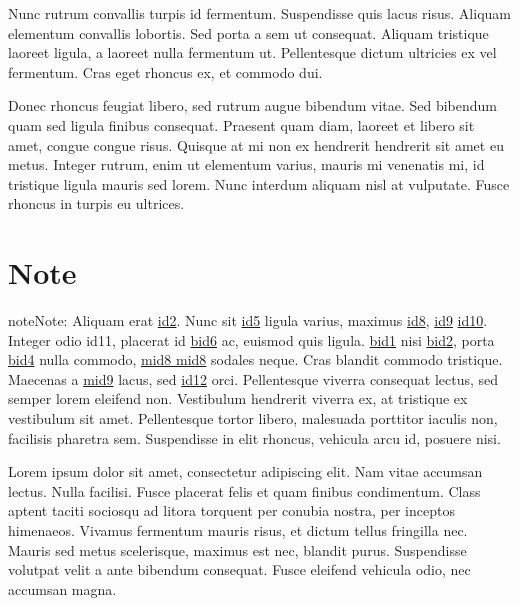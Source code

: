 \sphinxAtStartPar
Nunc rutrum convallis turpis id fermentum. Suspendisse quis lacus risus. Aliquam elementum convallis
lobortis. Sed porta a sem ut consequat. Aliquam tristique laoreet ligula, a laoreet nulla fermentum
ut. Pellentesque dictum ultricies ex vel fermentum. Cras eget rhoncus ex, et commodo dui.

\sphinxAtStartPar
Donec rhoncus feugiat libero, sed rutrum augue bibendum vitae. Sed bibendum quam sed ligula finibus
consequat. Praesent quam diam, laoreet et libero sit amet, congue congue risus. Quisque at mi non ex
hendrerit hendrerit sit amet eu metus. Integer rutrum, enim ut elementum varius, mauris mi venenatis
mi, id tristique ligula mauris sed lorem. Nunc interdum aliquam nisl at vulputate. Fusce rhoncus in
turpis eu ultrices.


\section{Note}
\label{\detokenize{test:note}}
\begin{sphinxadmonition}{note}{Note:}
\sphinxAtStartPar
Aliquam erat \hyperlink{\detokenize{id2}}{id2}. Nunc sit \hyperlink{\detokenize{id5}}{id5} ligula varius, maximus
\hyperlink{\detokenize{id8}}{id8}, \hyperlink{\detokenize{id9}}{id9} \hyperlink{\detokenize{id10}}{id10}. Integer odio
\hypertarget{\detokenize{id11}}{id11}, placerat id \hyperlink{\detokenize{bid6-ref46}}{\hypertarget{\detokenize{bid6}}{bid6}} ac, euismod quis ligula.
\hyperlink{\detokenize{bid1}}{\hypertarget{\detokenize{bid1-ref38}}{bid1}} nisi \hyperlink{\detokenize{bid2}}{\hypertarget{\detokenize{bid2-ref39}}{bid2}}, porta \hyperlink{\detokenize{bid4}}{\hypertarget{\detokenize{bid4-ref40}}{bid4}} nulla
commodo, \hyperlink{\detokenize{test-mid8-id0}}{\hypertarget{\detokenize{test-mid8-id1}}{mid8 mid8}} sodales neque. Cras blandit commodo tristique. Maecenas a
\hyperlink{\detokenize{test-mid9-id1}}{\hypertarget{\detokenize{test-mid9-id0}}{mid9}} lacus, sed \hyperlink{\detokenize{id12}}{id12} orci.
Pellentesque viverra consequat lectus, sed semper lorem eleifend non. Vestibulum hendrerit viverra
ex, at tristique ex vestibulum sit amet. Pellentesque tortor libero, malesuada porttitor iaculis
non, facilisis pharetra sem. Suspendisse in elit rhoncus, vehicula arcu id, posuere nisi.
\end{sphinxadmonition}

\sphinxAtStartPar
Lorem ipsum dolor sit amet, consectetur adipiscing elit. Nam vitae accumsan lectus. Nulla facilisi.
Fusce placerat felis et quam finibus condimentum. Class aptent taciti sociosqu ad litora torquent
per conubia nostra, per inceptos himenaeos. Vivamus fermentum mauris risus, et dictum tellus
fringilla nec. Mauris sed metus scelerisque, maximus est nec, blandit purus. Suspendisse volutpat
velit a ante bibendum consequat. Fusce eleifend vehicula odio, nec accumsan magna.

